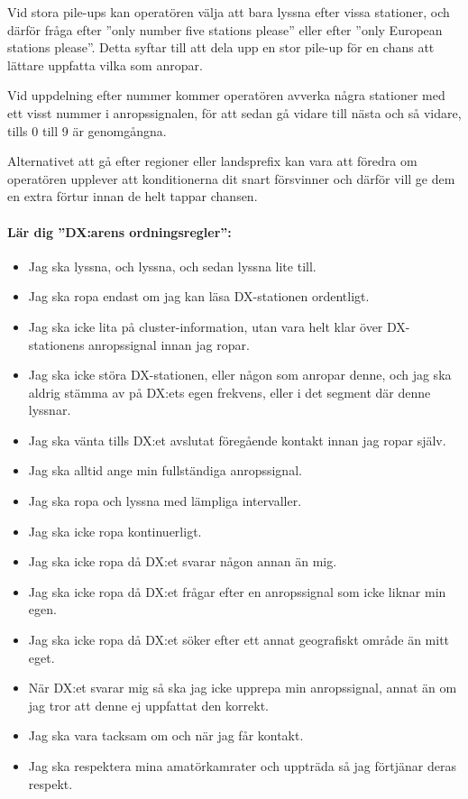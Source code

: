 Vid stora pile-ups kan operatören välja att bara lyssna efter vissa stationer,
och därför fråga efter ''only number five stations please'' eller efter ''only
European stations please''.
Detta syftar till att dela upp en stor pile-up för en chans att lättare
uppfatta vilka som anropar.

Vid uppdelning efter nummer kommer operatören avverka några stationer med ett
visst nummer i anropssignalen, för att sedan gå vidare till nästa och så
vidare, tills 0 till 9 är genomgångna.

Alternativet att gå efter regioner eller landsprefix kan vara att föredra om
operatören upplever att konditionerna dit snart försvinner och därför vill ge
dem en extra förtur innan de helt tappar chansen.

\paragraph{Lär dig ''DX:arens ordningsregler'':}

\begin{itemize}
\item Jag ska lyssna, och lyssna, och sedan lyssna lite till.
\item Jag ska ropa endast om jag kan läsa DX-sta\-tion\-en ordentligt.
\item Jag ska icke lita på cluster-information, utan vara helt klar över DX-stationens anropssignal innan jag ropar.
\item Jag ska icke störa DX-stationen, eller någon som anropar denne, och jag ska aldrig stämma av på DX:ets egen frekvens, eller i det segment där denne lyssnar.
\item Jag ska vänta tills DX:et avslutat föregående kontakt innan jag ropar själv.
\item Jag ska alltid ange min fullständiga anropssignal.
\item Jag ska ropa och lyssna med lämpliga intervaller.
\item Jag ska icke ropa kontinuerligt.
\item Jag ska icke ropa då DX:et svarar någon annan än mig.
\item Jag ska icke ropa då DX:et frågar efter en anropssignal som icke liknar min egen.
\item Jag ska icke ropa då DX:et söker efter ett annat geografiskt område än mitt eget.
\item När DX:et svarar mig så ska jag icke upprepa min anropssignal, annat än om jag tror att denne ej uppfattat den korrekt.
\item Jag ska vara tacksam om och när jag får kontakt.
\item Jag ska respektera mina amatörkamrater och uppträda så jag förtjänar deras respekt.
\end{itemize}

